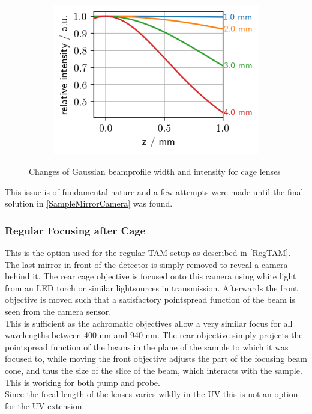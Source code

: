\documentclass[twoside,openright]{scrreprt}
\begin{document}
\begin{figure}[h]
\begin{subfigure}[t]{0.5\textwidth}
\includegraphics[width =\textwidth]{images/DOFintensity_inputWidth_653nm.png} 
\end{subfigure}
\caption{Changes of Gaussian beamprofile width and intensity for cage lenses}
\end{figure}

This issue is of fundamental nature and a few attempts were made until the final solution in \ref{SampleMirrorCamera} was found.
\subsubsection{Regular Focusing after Cage}\label{regRearFocus}
This is the option used for the regular TAM setup as described in \ref{RegTAM}. The last mirror in front of the detector is simply removed to reveal a camera behind it. The rear cage objective is focused onto this camera using white light from an LED torch or similar lightsources in transmission. Afterwards the front objective is moved such that a satisfactory pointspread function of the beam is seen from the camera sensor.\\ 
This is sufficient as the achromatic objectives allow a very similar focus for all wavelengths between 400 nm and 940 nm. The rear objective simply projects the pointspread function of the beams in the plane of the sample to which it was focused to, while moving the front objective adjusts the part of the focusing beam cone, and thus the size of the slice of the beam, which interacts with the sample. This is working for both pump and probe.\\
Since the focal length of the lenses varies wildly in the UV this is not an option for the UV extension.
\end{document}
